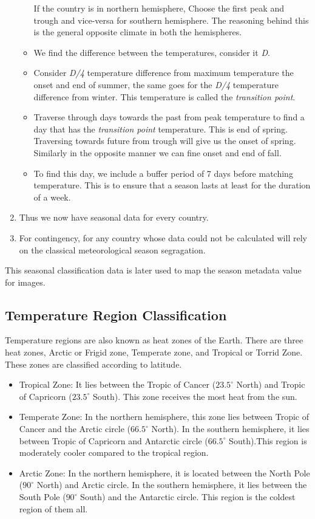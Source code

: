 \begin{enumerate}
\begin{itemize}
        If the country is in northern hemisphere, Choose the first peak and trough and vice-versa for southern hemisphere. The reasoning behind this is the general opposite climate in both the hemispheres.
        \item We find the difference between the temperatures, consider it \textit{D}.
        \item Consider \textit{D/4} temperature difference from maximum temperature the onset and end of summer, the same goes for the \textit{D/4} temperature difference from winter. This temperature is called the \textit{transition point}.
        \item Traverse through days towards the past from peak temperature to find a day that has the \textit{transition point} temperature. This is end of spring. Traversing towards future from trough will give us the onset of spring. Similarly in the opposite manner we can fine onset and end of fall.
        \item To find this day, we include a buffer period of 7 days before matching temperature. This is to ensure that a season lasts at least for the duration of a week.
    \end{itemize}
    \item Thus we now have seasonal data for every country.
    \item For contingency, for any country whose data could not be calculated will rely on the classical meteorological season segragation.
\end{enumerate}

This seasonal classification data is later used to map the season metadata value for images.

\subsection{Temperature Region Classification}

Temperature regions are also known as heat zones of the Earth. There are three heat zones, Arctic or Frigid zone, Temperate zone, and Tropical or Torrid Zone. These zones are classified according to latitude.

\begin{itemize}
    \item Tropical Zone: It lies between the Tropic of Cancer ($23.5^\circ$ North) and Tropic of Capricorn ($23.5^\circ$ South). This zone receives the most heat from the sun.
    \item Temperate Zone: In the northern hemisphere, this zone lies between Tropic of Cancer and the Arctic circle ($66.5^\circ$ North). In the southern hemisphere, it lies between Tropic of Capricorn and Antarctic circle ($66.5^\circ$ South).This region is moderately cooler compared to the tropical region.
    \item Arctic Zone: In the northern hemisphere, it is located between the North Pole ($90^\circ$ North) and Arctic circle. In the southern hemisphere, it lies between the South Pole ($90^\circ$ South) and the Antarctic circle. This region is the coldest region of them all.
\end{itemize}

